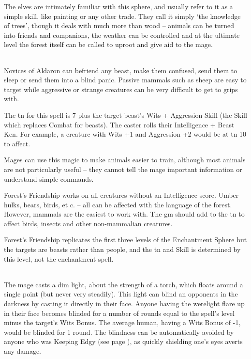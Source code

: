 \begin{multicols}{2}

The elves are intimately familiar with this sphere, and usually refer to it as a simple skill, like painting or any other trade. They call it simply `the knowledge of trees', though it deals with much more than wood -- animals can be turned into friends and companions, the weather can be controlled and at the ultimate level the forest itself can be called to uproot and give aid to the mage.

\spelllevel

\\
Novices of Aldaron can befriend any beast, make them confused, send them to sleep or send them into a blind panic.
Passive mammals such as sheep are easy to target while aggressive or strange creatures can be very difficult to get to grips with.

The \gls{tn} for this spell is 7 plus the target beast's Wits + Aggression Skill (the Skill which replaces Combat for beasts). The caster rolls their Intelligence + Beast Ken. For example, a creature with Wits +1 and Aggression +2 would be at \gls{tn} 10 to affect.

Mages can use this magic to make animals easier to train, although most animals are not particularly useful -- they cannot tell the mage important information or understand simple commands.

Forest's Friendship works on all creatures without an Intelligence score. Umber hulks, bears, birds, et c. -- all can be affected with the language of the forest.
However, mammals are the easiest to work with.
The \gls{gm} should add to the \gls{tn} to affect birds, insects and other non-mammalian creatures.

Forest's Friendship replicates the first three levels of the Enchantment Sphere but the targets are beasts rather than people, and the \gls{tn} and Skill is determined by this level, not the enchantment spell.

\\
The mage casts a dim light, about the strength of a torch, which floats around a single point (but never very steadily).
This light can blind an opponents in the darkness by casting it directly in their face.
Anyone having the werelight flare up in their face becomes blinded for a number of rounds equal to the spell's level minus the target's Wits Bonus.
The average human, having a Wits Bonus of -1, would be blinded for 1 round.
The blindness can be automatically avoided by anyone who was Keeping Edgy (see page \pageref{edgy}), as quickly shielding one's eyes averts any damage.


\end{multicols}
